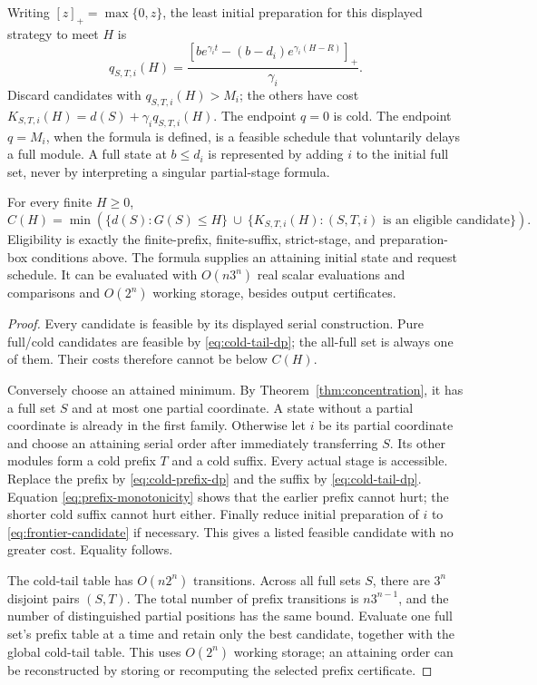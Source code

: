 Writing \([z]_+=\max\{0,z\}\), the least initial preparation for this
displayed strategy to meet \(H\) is
\begin{equation}
 q_{S,T,i}(H)=
 \frac{\left[b e^{\gamma_i t}
       -(b-d_i)e^{\gamma_i(H-R)}\right]_+}{\gamma_i}.
 \label{eq:frontier-candidate}
\end{equation}
Discard candidates with \(q_{S,T,i}(H)>M_i\); the others have cost
\(K_{S,T,i}(H)=d(S)+\gamma_i q_{S,T,i}(H)\).
The endpoint \(q=0\) is cold. The endpoint \(q=M_i\), when the formula is
defined, is a feasible schedule that voluntarily delays a full module.
A full state at \(b\leq d_i\) is represented by adding \(i\) to the initial
full set, never by interpreting a singular partial-stage formula.

\begin{theorem}
\label{thm:frontier}
For every finite \(H\geq0\),
\begin{equation}
 C(H)=\min\left(
 \{d(S):G(S)\leq H\}
 \ \cup\
 \{K_{S,T,i}(H):(S,T,i)\text{ is an eligible candidate}\}
 \right).
 \label{eq:explicit-frontier}
\end{equation}
Eligibility is exactly the finite-prefix, finite-suffix, strict-stage, and
preparation-box conditions above. The formula supplies an attaining initial
state and request schedule. It can be evaluated with
\(O(n3^n)\) real scalar evaluations and comparisons and \(O(2^n)\) working
storage, besides output certificates.
\end{theorem}
\begin{proof}
Every candidate is feasible by its displayed serial construction. Pure
full/cold candidates are feasible by \eqref{eq:cold-tail-dp}; the all-full
set is always one of them. Their costs therefore cannot be below \(C(H)\).

Conversely choose an attained minimum. By
Theorem~\ref{thm:concentration}, it has a full set \(S\) and at most one
partial coordinate. A state without a partial coordinate is already in the
first family. Otherwise let \(i\) be its partial coordinate and choose an
attaining serial order after immediately transferring \(S\). Its other
modules form a cold prefix \(T\) and a cold suffix. Every actual stage is
accessible. Replace the prefix by \eqref{eq:cold-prefix-dp} and the suffix
by \eqref{eq:cold-tail-dp}. Equation \eqref{eq:prefix-monotonicity} shows that
the earlier prefix cannot hurt; the shorter cold suffix cannot hurt either.
Finally reduce initial preparation of \(i\) to
\eqref{eq:frontier-candidate} if necessary. This gives a listed feasible
candidate with no greater cost. Equality follows.

The cold-tail table has \(O(n2^n)\) transitions. Across all full sets \(S\),
there are \(3^n\) disjoint pairs \((S,T)\). The total number of prefix
transitions is \(n3^{n-1}\), and the number of distinguished partial positions
has the same bound. Evaluate one full set's prefix table at a time and retain
only the best candidate, together with the global cold-tail table.
This uses \(O(2^n)\) working storage; an attaining order can be reconstructed
by storing or recomputing the selected prefix certificate.
\end{proof}

